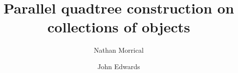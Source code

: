 \documentclass[final,3p,times,twocolumn]{elsarticle}
\begin{document}
\begin{frontmatter}



\title{Parallel quadtree construction on collections of objects}

\author{Nathan Morrical}
\author{John Edwards}%

\address{Idaho State University, Pocatello, ID, USA}






\end{frontmatter}
\end{document}

